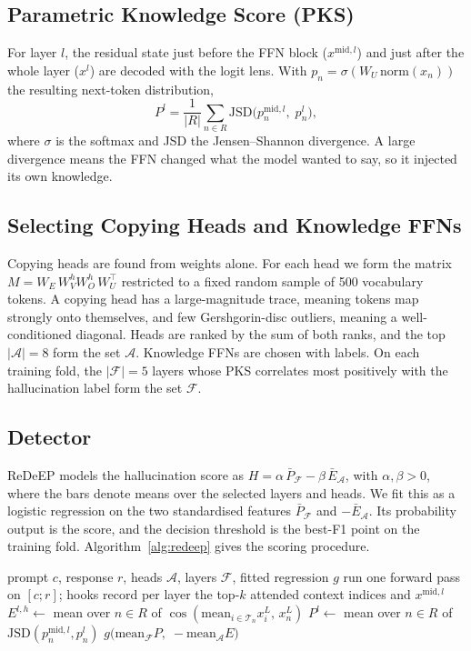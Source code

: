 \documentclass[conference]{IEEEtran}
\begin{document}
\subsection{Parametric Knowledge Score (PKS)}
For layer $l$, the residual state just before the FFN block ($x^{\mathrm{mid},l}$) and just after the whole layer ($x^{l}$) are decoded with the logit lens. With $p_n = \sigma(W_U\,\mathrm{norm}(x_n))$ the resulting next-token distribution,
\begin{equation}
P^{l} = \frac{1}{|R|}\sum_{n\in R}\mathrm{JSD}\big(p^{\mathrm{mid},l}_n,\; p^{l}_n\big),
\end{equation}
where $\sigma$ is the softmax and JSD the Jensen--Shannon divergence. A large divergence means the FFN changed what the model wanted to say, so it injected its own knowledge.

\subsection{Selecting Copying Heads and Knowledge FFNs}
Copying heads are found from weights alone. For each head we form the matrix $M = W_E\,W_V^{h}W_O^{h}\,W_U^{\top}$ restricted to a fixed random sample of 500 vocabulary tokens. A copying head has a large-magnitude trace, meaning tokens map strongly onto themselves, and few Gershgorin-disc outliers, meaning a well-conditioned diagonal. Heads are ranked by the sum of both ranks, and the top $|\mathcal{A}|=8$ form the set $\mathcal{A}$. Knowledge FFNs are chosen with labels. On each training fold, the $|\mathcal{F}|=5$ layers whose PKS correlates most positively with the hallucination label form the set $\mathcal{F}$.

\subsection{Detector}
ReDeEP models the hallucination score as $H = \alpha\,\bar{P}_{\mathcal{F}} - \beta\,\bar{E}_{\mathcal{A}}$, with $\alpha,\beta>0$, where the bars denote means over the selected layers and heads. We fit this as a logistic regression on the two standardised features $\bar{P}_{\mathcal{F}}$ and $-\bar{E}_{\mathcal{A}}$. Its probability output is the score, and the decision threshold is the best-F1 point on the training fold. Algorithm~\ref{alg:redeep} gives the scoring procedure.

\begin{algorithm}[t]
\caption{ReDeEP scoring of one response}
\label{alg:redeep}
\small
\begin{algorithmic}[1]
\Require prompt $c$, response $r$, heads $\mathcal{A}$, layers $\mathcal{F}$, fitted regression $g$
\State run one forward pass on $[c; r]$; hooks record per layer the top-$k$ attended context indices and $x^{\mathrm{mid},l}$
  \State $E^{l,h}\gets$ mean over $n\in R$ of $\cos(\text{mean}_{i\in\mathcal{T}_n} x^{L}_i,\, x^{L}_n)$
\EndFor
{}
  \State $P^{l}\gets$ mean over $n\in R$ of $\mathrm{JSD}(p^{\mathrm{mid},l}_n, p^{l}_n)$
\EndFor
\State \Return $g\big(\mathrm{mean}_{\mathcal{F}}P,\; -\mathrm{mean}_{\mathcal{A}}E\big)$
\end{algorithmic}
\end{algorithm}
\end{document}
